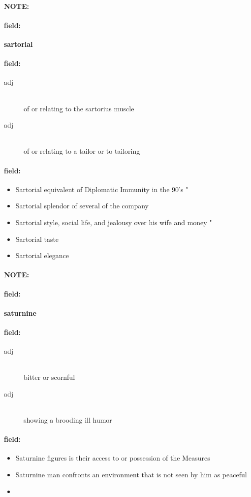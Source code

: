 \documentclass[12pt]{article}
\newenvironment{note}{\paragraph{NOTE:}}{}
\newenvironment{field}{\paragraph{field:}}{}
\begin{document}
\begin{note}
\begin{field}
\textbf{\large sartorial}
\end{field}


\begin{field}
\begin{description}
\item[adj] \hfill \\ 
of or relating to the sartorius muscle

\item[adj] \hfill \\ 
of or relating to a tailor or to tailoring

\end{description}
\end{field}

\begin{field}
\begin{itemize}
\item Sartorial equivalent of Diplomatic Immunity in the 90's " 
\item Sartorial splendor of several of the company
\item Sartorial style, social life, and jealousy over his wife and money " 
\item Sartorial taste
\item Sartorial elegance
\end{itemize}
\end{field}
\end{note}
\begin{note}
\begin{field}
\textbf{\large saturnine}
\end{field}


\begin{field}
\begin{description}
\item[adj] \hfill \\ 
bitter or scornful

\item[adj] \hfill \\ 
showing a brooding ill humor

\end{description}
\end{field}

\begin{field}
\begin{itemize}
\item Saturnine figures is their access to or possession of the Measures 
\item Saturnine man confronts an environment that is not seen by him as peaceful
\item 
\end{itemize}
\end{field}
\end{note}
\end{document}
